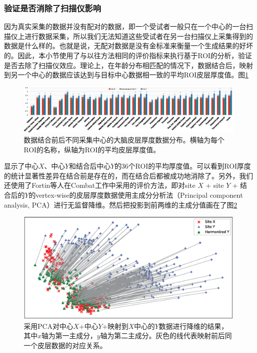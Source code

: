 \subsubsection{验证是否消除了扫描仪影响}
因为真实采集的数据并没有配对的数据，即一个受试者一般只在一个中心的一台扫描仪上进行数据采集，所以我们无法知道这些受试者在另一台扫描仪上采集得到的数据是什么样的。也就是说，无配对数据是没有金标准来衡量一个生成结果的好坏的。因此，本小节使用了与以往方法\cite{karayumak2019retrospective}相同的评价指标来执行基于ROI的分析，验证是否去除了扫描仪效应。理论上，在年龄分布相匹配的情况下，数据结合后，映射到另一个中心的数据应该达到与目标中心数据相一致的平均ROI皮层厚度值。图\ref{fig:s2sgan_roi_bar_realA_realB_fakeA}
\begin{figure}[h]
\centering
\includegraphics[width=\linewidth]{figure/s2sgan_roi_bar_realA_realB_fakeA.eps}
\caption{数据结合前后不同采集中心的大脑皮层厚度数据分布。横轴为每个ROI的名称，纵轴为ROI的平均皮层厚度值。}\label{fig:s2sgan_roi_bar_realA_realB_fakeA} 
\end{figure}
显示了中心$X$、中心$Y$和结合后中心$Y$的36个ROI的平均厚度值。可以看到ROI厚度的统计显著性差异在结合前是存在的，而在结合后都被成功地消除了。另外，我们还使用了Fortin等人在Combat\cite{fortin2018harmonization}工作中采用的评价方法，即对site $X$ + site $Y$ + 结合后的$Y$的vertex-wise的皮层厚度数据使用主成分分析法（Principal component analysis, PCA）进行无监督降维。然后把投影到前两维的主成分值画在了图\ref{fig:s2sgan_pca}
\begin{figure}[h]
\centering
\includegraphics[width=\linewidth]{figure/s2sgan_pca.eps}
\caption{采用PCA对中心$X$+中心$Y$+映射到$X$中心的$Y$数据进行降维的结果，其中$x$轴为第一主成分，$y$轴为第二主成分。灰色的线代表映射前后同一个皮层数据的对应关系。}\label{fig:s2sgan_pca} 
\end{figure} 
